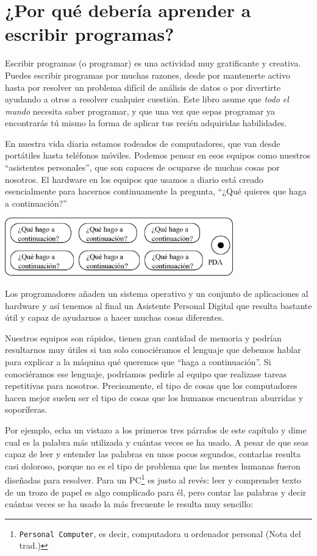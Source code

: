 
\chapter{¿Por qué debería aprender a escribir programas?}

Escribir programas (o programar) es una actividad muy
gratificante y creativa. Puedes escribir programas por
muchas razones, desde por mantenerte activo hasta
por resolver un problema difícil de análisis de datos o
por divertirte ayudando a otros a resolver cualquier cuestión.
Este libro asume que \emph{todo el mundo} necesita saber programar,
y que una vez que sepas programar ya encontrarás tú mismo
la forma de aplicar tus recién adquiridas habilidades.

En nuestra vida diaria estamos rodeados de computadores, que van
desde portátiles hasta teléfonos móviles. Podemos pensar en esos
equipos como nuestros ``asistentes personales'', que son capaces de
ocuparse de muchas cosas por nosotros. El hardware en los equipos
que usamos a diario está creado esencialmente para hacernos
continuamente la pregunta,
``¿Qué quieres que haga a continuación?''

\beforefig
\centerline{\includegraphics[height=1.00in]{figs2/pda.eps}}
\afterfig

Los programadores añaden un sistema operativo y un conjunto de
aplicaciones al hardware y así tenemos al final un Asistente Personal
Digital que resulta bastante útil y capaz de ayudarnos a hacer
muchas cosas diferentes.

Nuestros equipos son rápidos, tienen gran cantidad de memoria
y podrían resultarnos muy útiles si tan solo conociéramos el lenguaje
que debemos hablar para explicar a la máquina qué queremos que
``haga a continuación''. Si conociéramos ese lenguaje, podríamos pedirle al
equipo que realizase tareas repetitivas para nosotros. 
Precisamente, el tipo de cosas que los computadores hacen mejor
suelen ser el tipo de cosas que los humanos encuentran aburridas
y soporíferas.

Por ejemplo, echa un vistazo a los primeros tres párrafos de este
capítulo y dime cual es la palabra más utilizada y cuántas veces
se ha usado. A pesar de que seas capaz de leer y entender
las palabras en unos pocos segundos, contarlas resulta casi doloroso,
porque no es el tipo de problema que las mentes humanas
fueron diseñadas para resolver. Para un
PC\footnote{{\tt Personal Computer}, es decir, computadora u ordenador personal (Nota del trad.)}
es justo al revés: leer y comprender texto
de un trozo de papel es algo complicado para él,
pero contar las palabras y decir cuántas veces
se ha usado la más frecuente le resulta muy sencillo:


